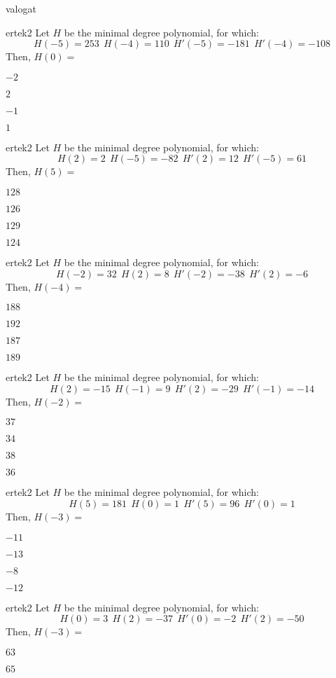 \documentclass[12pt]{article}
\begin{document}
\begin{quiz}{valogat}
\begin{multi}{ertek2}
Let $H$ be the minimal degree polynomial, for which:
$$
H(-5)=253\ \ H(-4)=110 \ \ H'(-5)=-181 \ \ H'(-4)=-108
$$
Then, $H(0)=$
\item* $ -2 $
\item  $ 2 $
\item  $ -1 $
\item  $ 1 $
\end{multi}\begin{multi}{ertek2}
Let $H$ be the minimal degree polynomial, for which:
$$
H(2)=2\ \ H(-5)=-82 \ \ H'(2)=12 \ \ H'(-5)=61
$$
Then, $H(5)=$
\item* $ 128 $
\item  $ 126 $
\item  $ 129 $
\item  $ 124 $
\end{multi}\begin{multi}{ertek2}
Let $H$ be the minimal degree polynomial, for which:
$$
H(-2)=32\ \ H(2)=8 \ \ H'(-2)=-38 \ \ H'(2)=-6
$$
Then, $H(-4)=$
\item* $ 188 $
\item  $ 192 $
\item  $ 187 $
\item  $ 189 $
\end{multi}\begin{multi}{ertek2}
Let $H$ be the minimal degree polynomial, for which:
$$
H(2)=-15\ \ H(-1)=9 \ \ H'(2)=-29 \ \ H'(-1)=-14
$$
Then, $H(-2)=$
\item* $ 37 $
\item  $ 34 $
\item  $ 38 $
\item  $ 36 $
\end{multi}\begin{multi}{ertek2}
Let $H$ be the minimal degree polynomial, for which:
$$
H(5)=181\ \ H(0)=1 \ \ H'(5)=96 \ \ H'(0)=1
$$
Then, $H(-3)=$
\item* $ -11 $
\item  $ -13 $
\item  $ -8 $
\item  $ -12 $
\end{multi}\begin{multi}{ertek2}
Let $H$ be the minimal degree polynomial, for which:
$$
H(0)=3\ \ H(2)=-37 \ \ H'(0)=-2 \ \ H'(2)=-50
$$
Then, $H(-3)=$
\item* $ 63 $
\item  $ 65 $

\end{multi}
\end{quiz}
\end{document}
